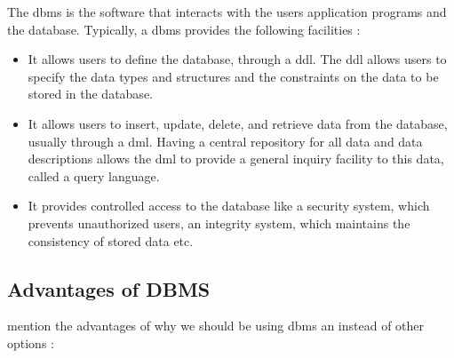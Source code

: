 The \gls{dbms} is the software that interacts with the users application programs and the database. Typically, a \gls{dbms} provides the following facilities \cite{begg}:

\begin{itemize}
    \item It allows users to define the database, through a \gls{ddl}. The \gls{ddl} allows users to specify the data types and structures and the constraints on the data to be stored in the database.
    \item It allows users to insert, update, delete, and retrieve data from the database, usually through a \gls{dml}. Having a central repository for all data and data descriptions allows the \gls{dml} to provide a general inquiry facility to this data, called a query language.
    \item It provides controlled access to the database like a security system, which prevents unauthorized users, an integrity system, which maintains the consistency of stored data etc.
\end{itemize}


\subsection{Advantages of DBMS}
\citeauthor{gehrke_2002} mention the advantages of why we should be using \gls{dbms} an instead of other options \cite{gehrke_2002}:

